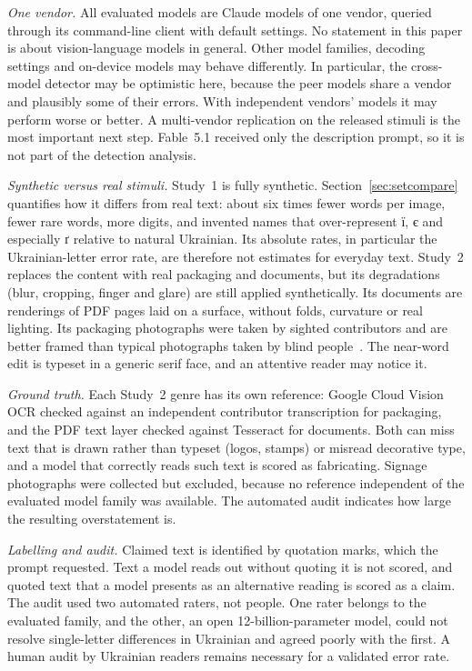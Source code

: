 \documentclass[pdflatex,sn-mathphys-num]{sn-jnl}%
\theoremstyle{thmstyleone}%
\theoremstyle{thmstyletwo}%
\theoremstyle{thmstylethree}%
\begin{document}
\emph{One vendor.} All evaluated models are Claude models of one vendor, queried through its command-line client with default settings. No statement in this paper is about vision-language models in general. Other model families, decoding settings and on-device models may behave differently. In particular, the cross-model detector may be optimistic here, because the peer models share a vendor and plausibly some of their errors. With independent vendors' models it may perform worse or better. A multi-vendor replication on the released stimuli is the most important next step. Fable~5.1 received only the description prompt, so it is not part of the detection analysis.

\emph{Synthetic versus real stimuli.} Study~1 is fully synthetic. Section~\ref{sec:setcompare} quantifies how it differs from real text: about six times fewer words per image, fewer rare words, more digits, and invented names that over-represent \foreignlanguage{ukrainian}{ї}, \foreignlanguage{ukrainian}{є} and especially \foreignlanguage{ukrainian}{ґ} relative to natural Ukrainian. Its absolute rates, in particular the Ukrainian-letter error rate, are therefore not estimates for everyday text. Study~2 replaces the content with real packaging and documents, but its degradations (blur, cropping, finger and glare) are still applied synthetically. Its documents are renderings of PDF pages laid on a surface, without folds, curvature or real lighting. Its packaging photographs were taken by sighted contributors and are better framed than typical photographs taken by blind people~\cite{gurari2018vizwiz}. The near-word edit is typeset in a generic serif face, and an attentive reader may notice it.

\emph{Ground truth.} Each Study~2 genre has its own reference: Google Cloud Vision OCR checked against an independent contributor transcription for packaging, and the PDF text layer checked against Tesseract for documents. Both can miss text that is drawn rather than typeset (logos, stamps) or misread decorative type, and a model that correctly reads such text is scored as fabricating. Signage photographs were collected but excluded, because no reference independent of the evaluated model family was available. The automated audit indicates how large the resulting overstatement is.

\emph{Labelling and audit.} Claimed text is identified by quotation marks, which the prompt requested. Text a model reads out without quoting it is not scored, and quoted text that a model presents as an alternative reading is scored as a claim. The audit used two automated raters, not people. One rater belongs to the evaluated family, and the other, an open 12-billion-parameter model, could not resolve single-letter differences in Ukrainian and agreed poorly with the first. A human audit by Ukrainian readers remains necessary for a validated error rate.
\end{document}
